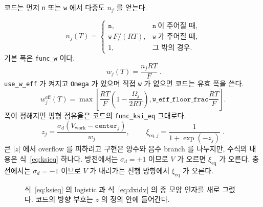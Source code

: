 \documentclass[11pt,a4paper]{article}
\newcommand{\eq}{\mathrm{eq}}
\newcommand{\eff}{\mathrm{eff}}
\newcommand{\work}{\mathrm{work}}
\begin{document}
코드는 먼저 \texttt{n} 또는 \texttt{w} 에서 다중도 $n_j$ 를 얻는다.

\begin{equation}
n_j(T)=
\begin{cases}
\texttt{n},&\texttt{n}\ \text{이 주어질 때},\\
\texttt{w}\,F/(RT),&\texttt{w}\ \text{가 주어질 때},\\
1,&\text{그 밖의 경우}.
\end{cases}
\label{eq:nfactor}
\end{equation}
기본 폭은 \texttt{func\_w} 이다.
\begin{equation}
\boxed{\;w_j(T)=\frac{n_jRT}{F}\;.}
\label{eq:w}
\end{equation}
\texttt{use\_w\_eff} 가 켜지고 \texttt{Omega} 가 있으며 직접 \texttt{w} 가 없으면 코드는 유효 폭을 쓴다.
\begin{equation}
w_j^{\eff}(T)=
\max\!\left[
\frac{RT}{F}\left(1-\frac{\Omega_j}{2RT}\right),
\texttt{w\_eff\_floor\_frac}\frac{RT}{F}
\right].
\label{eq:weffcode}
\end{equation}
폭이 정해지면 평형 점유율은 코드의 \texttt{func\_ksi\_eq} 그대로다.
\begin{equation}
z_j=\frac{\sigma_d\left(V_{\work}-\texttt{center}_j\right)}{w_j},
\qquad
\boxed{\;\xi_{\eq,j}=\frac{1}{1+\exp(-z_j)}\;.}
\label{eq:ksieq}
\end{equation}
큰 $|z|$ 에서 overflow 를 피하려고 구현은 양수와 음수 branch 를 나누지만, 수식의 내용은 식~\eqref{eq:ksieq} 하나다. 방전에서는 $\sigma_d=+1$ 이므로 $V$ 가 오르면 $\xi_{\eq}$ 가 오른다. 충전에서는 $\sigma_d=-1$ 이므로 $V$ 가 내려가는 진행 방향에서 $\xi_{\eq}$ 가 오른다.

\begin{figure}[t]
\centering
{}
\caption{식~\eqref{eq:ksieq} 의 logistic 과 식~\eqref{eq:dxidv} 의 종 모양 인자를 새로 그렸다. 코드의 방향 부호는 $z$ 의 정의 안에 들어간다.}
\label{fig:logistic}
\end{figure}
\end{document}
